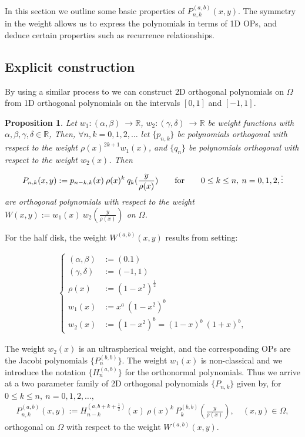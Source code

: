\documentclass[11pt, oneside]{article}   	%
\newcommand{\half}{\frac{1}{2}}
\newcommand{\R}{\mathbb{R}}
\newcommand{\Pnk}{P_{n,k}}
\newtheorem{proposition}{Proposition}
\begin{document}
In this section we outline some basic properties of $P_{n,k}^{(a,b)}(x,y)$. The symmetry in the weight allows us to express the polynomials in terms of 1D OPs, and deduce certain properties such as recurrence relationships. 

\subsection{Explicit construction}


By using a similar process to \cite[p55--56]{dunkl2014orthogonal} we can construct 2D orthogonal polynomials on $\Omega$ from 1D orthogonal polynomials on the intervals \([0,1]\) and \([-1,1]\).

\begin{proposition}
Let \(w_1 : (\alpha,\beta) \: \to \R\), \(w_2 : (\gamma,\delta) \: \to \R\) be weight functions with \(\alpha,\beta,\gamma,\delta \in \R\),
Then, \(\forall n,k = 0,1,2,\dots\) let \(\{p_{n,k}\}\) be polynomials orthogonal with respect to the weight \(\rho(x)^{2k+1} w_1(x)\), and \(\{q_{n}\}\) be polynomials orthogonal with respect to the weight \(w_2(x)\). Then
$$
\Pnk(x,y) := p_{n-k,k}(x) \: \rho(x)^k \: q_k(\frac{y}{\rho(x)}) \qquad\hbox{for} \qquad 0 \le k \le n, \: n = 0,1,2,\dots
$$
are orthogonal polynomials with respect to the weight \(W(x,y) := w_1(x) \: w_2(\frac{y}{\rho(x)}) \) on $\Omega$. 
\end{proposition}

For the half disk, the weight $W^{(a,b)}(x,y)$ results from setting:

\begin{align}
\begin{cases}
(\alpha,\beta) &:= (0.1) \\
(\gamma,\delta) &:= (-1,1) \\
\rho(x) &:= (1-x^2)^{\half} \\
w_1(x) &:= x^a \: (1-x^2)^b \\
w_2(x) &:= (1-x^2)^b = (1-x)^b \: (1+x)^b,
\end{cases}
\end{align}

The weight $w_2(x)$ is an ultraspherical weight, and the corresponding OPs are   the Jacobi polynomials  \(\{P_n^{(b, b)}\}\). The weight $w_1(x)$ is non-classical and we introduce the notation \(\{H_n^{(a, b)}\}\) for the orthonormal polynomials. Thus we arrive at  a two parameter family of  2D orthogonal polynomials \(\{\Pnk\}\) given by, for \(0 \le k \le n, \: n = 0,1,2,\dots,\)
\begin{align}
 \Pnk^{(a,b)}(x,y) := H_{n-k}^{(a, b+k+\half)}(x) \: \rho(x)^k \: P_k^{(b,b)}(\frac{y}{\rho(x)}), \quad (x,y) \in \Omega, 
\end{align}
orthogonal on \(\Omega\) with respect to the weight $W^{(a,b)}(x,y)$.
\end{document}
